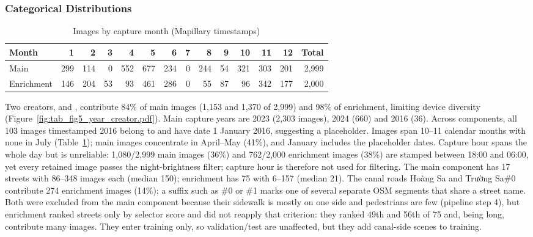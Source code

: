 \subsubsection*{Categorical Distributions}
\begin{table}[H]\centering\caption{Images by capture month (Mapillary timestamps)}\label{en:month}
\setlength{\tabcolsep}{3.5pt}
\begin{tabular}{l rrrrrrrrrrrr r}\toprule
Month & 1 & 2 & 3 & 4 & 5 & 6 & 7 & 8 & 9 & 10 & 11 & 12 & Total \\\midrule
Main & 299 & 114 & 0 & 552 & 677 & 234 & 0 & 244 & 54 & 321 & 303 & 201 & 2,999 \\
Enrichment & 146 & 204 & 53 & 93 & 461 & 286 & 0 & 55 & 87 & 96 & 342 & 177 & 2,000 \\\bottomrule
\end{tabular}\end{table}
Two creators,  and , contribute 84\% of main images (1,153 and 1,370 of 2,999) and 98\% of enrichment, limiting device diversity (Figure~\ref{fig:tab_fig5_year_creator.pdf}). Main capture years are 2023 (2,303 images), 2024 (660) and 2016 (36). Across components, all 103 images timestamped 2016 belong to  and have date 1 January 2016, suggesting a placeholder. Images span 10--11 calendar months with none in July (Table~\ref{en:month}); main images concentrate in April--May (41\%), and January includes the placeholder dates. Capture hour spans the whole day but is unreliable: 1,080/2,999 main images (36\%) and 762/2,000 enrichment images (38\%) are stamped between 18:00 and 06:00, yet every retained image passes the night-brightness filter; capture hour is therefore not used for filtering. The main component has 17 streets with 86--348 images each (median 150); enrichment has 75 with 6--157 (median 21). The canal roads Hoàng Sa and Trường Sa\#0 contribute 274 enrichment images (14\%); a suffix such as \#0 or \#1 marks one of several separate OSM segments that share a street name. Both were excluded from the main component because their sidewalk is mostly on one side and pedestrians are few (pipeline step 4), but enrichment ranked streets only by selector score and did not reapply that criterion: they ranked 49th and 56th of 75 and, being long, contribute many images. They enter training only, so validation/test are unaffected, but they add canal-side scenes to training.

